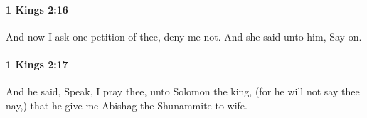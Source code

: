 		\paragraph{1 Kings 2:16} %
			\label{1KINGS-2-16}

			And now I ask one petition of thee, deny me not. And she said unto him, Say on.


		\paragraph{1 Kings 2:17} %
			\label{1KINGS-2-17}

			And he said, Speak, I pray thee, unto Solomon the king, (for he will not say thee nay,) that he give me Abishag the Shunammite to wife.



